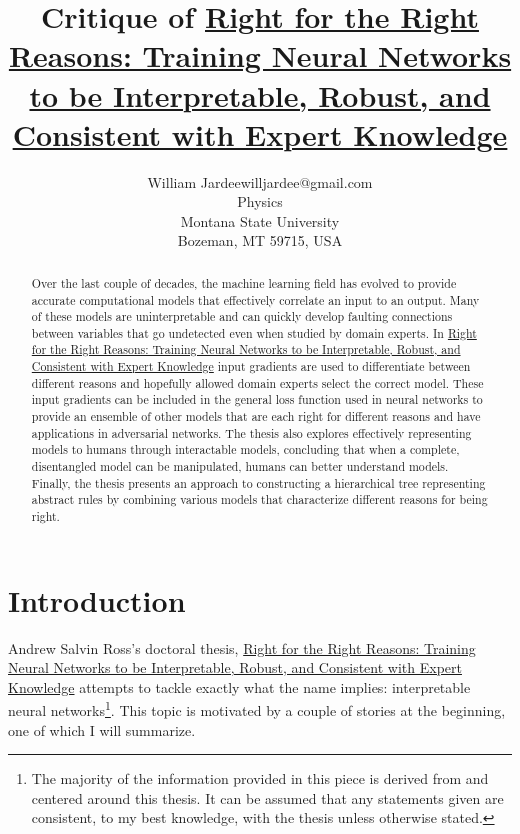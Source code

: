 \documentclass[twoside,11pt]{article}
\begin{document}
\title{Critique of \ul{Right for the Right Reasons: Training Neural Networks to be Interpretable, Robust, and Consistent with Expert Knowledge}}

\author{\name William Jardee\email willjardee@gmail.com \\
       \addr Physics\\
       Montana State University\\
       Bozeman, MT 59715, USA
       }

\maketitle

\begin{abstract}%
Over the last couple of decades, the machine learning field has evolved to provide accurate computational models that effectively correlate an input to an output. Many of these models are uninterpretable and can quickly develop faulting connections between variables that go undetected even when studied by domain experts. In \ul{Right for the Right Reasons: Training Neural Networks to be Interpretable, Robust, and Consistent with Expert Knowledge} input gradients are used to differentiate between different reasons and hopefully allowed domain experts select the correct model. These input gradients can be included in the general loss function used in neural networks to provide an ensemble of other models that are each right for different reasons and have applications in adversarial networks. The thesis also explores effectively representing models to humans through interactable models, concluding that when a complete, disentangled model can be manipulated, humans can better understand models. Finally, the thesis presents an approach to constructing a hierarchical tree representing abstract rules by combining various models that characterize different reasons for being right.
\end{abstract}
 
\section{Introduction}
Andrew Salvin Ross's doctoral thesis, \ul{Right for the Right Reasons: Training Neural Networks to be Interpretable, Robust, and Consistent with Expert Knowledge} \citep{ross2017right} attempts to tackle exactly what the name implies: interpretable neural networks\footnote{The majority of the information provided in this piece is derived from and centered around this thesis. It can be assumed that any statements given are consistent, to my best knowledge, with the thesis unless otherwise stated.}. This topic is motivated by a couple of stories at the beginning, one of which I will summarize. 
\end{document}

